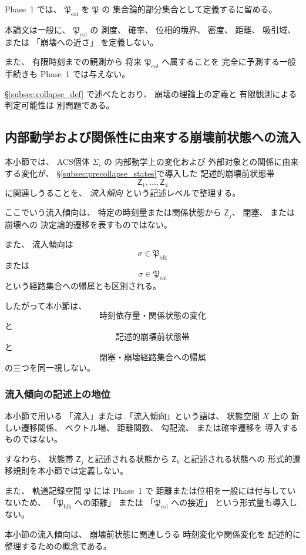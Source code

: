 \begin{remark}
\label{rem:col_phase1_scope}
Phase~1 では、
$\mathfrak{P}_{\mathrm{col}}$
を
$\mathfrak{P}$ の
集合論的部分集合として定義するに留める。

本論文は一般に、
$\mathfrak{P}_{\mathrm{col}}$ の
測度、
確率、
位相的境界、
密度、
距離、
吸引域、
または
「崩壊への近さ」
を定義しない。

また、
有限時刻までの観測から
将来
$\mathfrak{P}_{\mathrm{col}}$
へ属することを
完全に予測する一般手続きも
Phase~1 では与えない。

\S\ref{subsec:collapse_def}
で述べたとおり、
崩壊の理論上の定義と
有限観測による判定可能性は
別問題である。
\end{remark}

\subsection{内部動学および関係性に由来する崩壊前状態への流入}
\label{subsec:inflow_paths}

本小節では、
ACS個体 $\Sigma_i$ の
内部動学上の変化および
外部対象との関係に由来する変化が、
\S\ref{subsec:precollapse_states}で導入した
記述的崩壊前状態帯
\[
  \mathsf{Z}_1,\ldots,\mathsf{Z}_4
\]
に関連しうることを、
\emph{流入傾向}
という記述レベルで整理する。

ここでいう流入傾向は、
特定の時刻量または関係状態から
$\mathsf{Z}_j$、
閉塞、
または崩壊への
決定論的遷移を表すものではない。

また、
流入傾向は
\[
  \sigma\in\mathfrak{P}_{\mathrm{blk}}
\]
または
\[
  \sigma\in\mathfrak{P}_{\mathrm{col}}
\]
という経路集合への帰属とも区別される。

したがって本小節は、
\[
  \text{時刻依存量・関係状態の変化}
\]
と
\[
  \text{記述的崩壊前状態帯}
\]
と
\[
  \text{閉塞・崩壊経路集合への帰属}
\]
の三つを同一視しない。

\subsubsection{流入傾向の記述上の地位}

\begin{remark}[流入傾向は形式的な状態遷移関係ではない]
\label{rem:inflow_is_descriptive}
本小節で用いる
「流入」または
「流入傾向」という語は、
状態空間 $X$ 上の
新しい遷移関係、
ベクトル場、
距離関数、
勾配流、
または確率遷移を
導入するものではない。

すなわち、
状態帯 $\mathsf{Z}_j$ と記述される状態から
$\mathsf{Z}_k$ と記述される状態への
形式的遷移規則を本小節では定義しない。

また、
軌道記録空間
$\mathfrak{P}$
には
Phase~1 で
距離または位相を一般には付与していないため、
「$\mathfrak{P}_{\mathrm{blk}}$ への距離」
または
「$\mathfrak{P}_{\mathrm{col}}$ への接近」
という形式量も導入しない。

本小節の流入傾向は、
崩壊前状態に関連しうる
時刻変化や関係変化を
記述的に整理するための概念である。
\end{remark}

